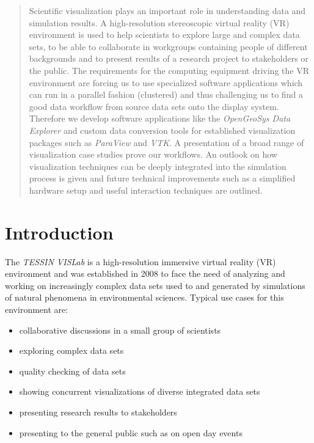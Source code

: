 \begin{abstract}
Scientific visualization plays an important role in understanding data and simulation results. A high-resolution stereoscopic virtual reality (VR) environment is used to help scientists to explore large and complex data sets, to be able to collaborate in workgroups containing people of different backgrounds and to present results of a research project to stakeholders or the public. The requirements for the computing equipment driving the VR environment are forcing us to use specialized software applications which can run in a parallel fashion (clustered) and thus challenging us to find a good data workflow from source data sets onto the display system. Therefore we develop software applications like the \emph{OpenGeoSys Data Explorer} and custom data conversion tools for established visualization packages such as \emph{ParaView} and \emph{VTK}. A presentation of a broad range of visualization case studies prove our workflows. An outlook on how visualization techniques can be deeply integrated into the simulation process is given and future technical improvements such as a simplified hardware setup and useful interaction techniques are outlined.

\end{abstract}


\section{Introduction}
\label{introduction}

The \emph{TESSIN VISLab} is a high-resolution immersive virtual reality (VR) environment and was established in 2008 to face the need of analyzing and working on increasingly complex data sets used to and generated by simulations of natural phenomena in environmental sciences. Typical use cases for this environment are:

\begin{itemize}
\itemsep1pt\parskip0pt
\item
  collaborative discussions in a small group of scientists
\item
  exploring complex data sets
\item
  quality checking of data sets
\item
  showing concurrent visualizations of diverse integrated data sets
\item
  presenting research results to stakeholders
\item
  presenting to the general public such as on open day events
\end{itemize}


